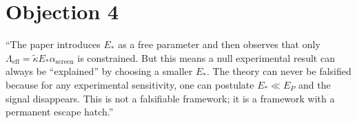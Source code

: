 \documentclass[11pt,letterpaper]{article}
\newcommand{\kt}{\tilde{\kappa}}
\newcommand{\Leff}{\Lambda_{\mathrm{eff}}}
\begin{document}
\section*{Objection 4}

\begin{tcolorbox}[breakable,enhanced,colback=red!3,colframe=red!60!black,
  fonttitle=\bfseries,title={Referee Objection 4: $E_*$ is unfalsifiable},
  boxrule=0.8pt]
``The paper introduces $E_*$ as a free parameter and then observes that only $\Leff =
\kt E_* \alpha_{\mathrm{screen}}$ is constrained.  But this means a null experimental
result can always be ``explained'' by choosing a smaller $E_*$.  The theory can never be
falsified because for any experimental sensitivity, one can postulate $E_* \ll E_P$ and
the signal disappears.  This is not a falsifiable framework; it is a framework with
a permanent escape hatch.''
\end{tcolorbox}
\end{document}
